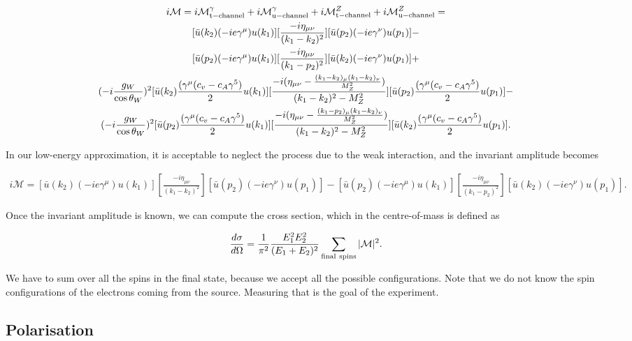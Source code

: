 \documentclass[10pt,swedish, openany]{book}
\begin{document}
\begin{multline}
\\
     i\mathcal{M} = i\mathcal{M}^{\gamma}_{\rm t-channel} + i\mathcal{M}^{\gamma}_{\rm u-channel} + i\mathcal{M}^{Z}_{\rm t-channel} + i\mathcal{M}^{Z}_{\rm u-channel} =\\ [\bar{u}(k_2)(-ie\gamma^{\mu})u(k_1)][\frac{-i\eta_{\mu\nu}}{(k_1-k_2)^2}][\bar{u}(p_2)(-ie\gamma^{\nu})u(p_1)] -\\
    [\bar{u}(p_2)(-ie\gamma^{\mu})u(k_1)][\frac{-i\eta_{\mu\nu}}{(k_1-p_2)^2}][\bar{u}(k_2)(-ie\gamma^{\nu})u(p_1)] +\\
    (-i \frac{g_W}{\cos{\theta_W}})^2[\bar{u}(k_2)\frac{(\gamma^{\mu}(c_v - c_A\gamma^5)}{2}u(k_1)][\frac{-i(\eta_{\mu\nu}-\frac{(k_1-k_2)_{\mu}(k_1-k_2)_{\nu}}{M_Z^2})}{(k_1-k_2)^2-M_Z^2}][\bar{u}(p_2)\frac{(\gamma^{\mu}(c_v - c_A\gamma^5)}{2}u(p_1)] -\\
    (-i \frac{g_W}{\cos{\theta_W}})^2[\bar{u}(p_2)\frac{(\gamma^{\mu}(c_v - c_A\gamma^5)}{2}u(k_1)][\frac{-i(\eta_{\mu\nu}-\frac{(k_1-p_2)_{\mu}(k_1-k_2)_{\nu}}{M_Z^2})}{(k_1-k_2)^2-M_Z^2}][\bar{u}(k_2)\frac{(\gamma^{\mu}(c_v - c_A\gamma^5)}{2}u(p_1)].
\end{multline}

In our low-energy approximation, it is acceptable to neglect the process due to the weak interaction, and the invariant amplitude becomes

\begin{multline}
     i\mathcal{M} = [\bar{u}(k_2)(-ie\gamma^{\mu})u(k_1)][\frac{-i\eta_{\mu\nu}}{(k_1-k_2)^2}][\bar{u}(p_2)(-ie\gamma^{\nu})u(p_1)] -
    [\bar{u}(p_2)(-ie\gamma^{\mu})u(k_1)][\frac{-i\eta_{\mu\nu}}{(k_1-p_2)^2}][\bar{u}(k_2)(-ie\gamma^{\nu})u(p_1)] .
\end{multline}

Once the invariant amplitude is known, we can compute the cross section, which in the centre-of-mass is defined as

\begin{equation}
    \frac{d\sigma}{d\Omega} = \frac{1}{\pi^2}\frac{E_1^2E_2^2}{(E_1+E_2)^2} \sum_{\rm final \ spins} |\mathcal{M}|^2.
\end{equation}

We have to sum over all the spins in the final state, because we accept all the possible configurations. Note that we do not know the spin configurations of the electrons coming from the source. Measuring that is the goal of the experiment.

\subsection{Polarisation}
\end{document}
